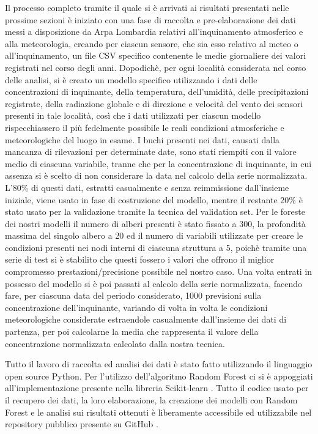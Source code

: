 \documentclass[a4paper]{report}
\begin{document}
Il processo completo tramite il quale si è arrivati ai risultati presentati nelle prossime sezioni è iniziato con una fase di raccolta e pre-elaborazione dei dati messi a disposizione da Arpa Lombardia relativi all'inquinamento atmosferico e alla meteorologia, creando per ciascun sensore, che sia esso relativo al meteo o all'inquinamento, un file CSV specifico contenente le medie giornaliere dei valori registrati nel corso degli anni. Dopodichè, per ogni località considerata nel corso delle analisi, si è creato un modello specifico utilizzando i dati delle concentrazioni di inquinante, della temperatura, dell'umidità, delle precipitazioni registrate, della radiazione globale e di direzione e velocità del vento dei sensori presenti in tale località, così che i dati utilizzati per ciascun modello rispecchiassero il più fedelmente possibile le reali condizioni atmosferiche e meteorologiche del luogo in esame. I buchi presenti nei dati, causati dalla mancanza di rilevazioni per determinate date, sono stati riempiti con il valore medio di ciascuna variabile, tranne che per la concentrazione di inquinante, in cui assenza si è scelto di non considerare la data nel calcolo della serie normalizzata. L'80\% di questi dati, estratti casualmente e senza reimmissione dall'insieme iniziale, viene usato in fase di costruzione del modello, mentre il restante 20\% è stato usato per la validazione tramite la tecnica del validation set. Per le foreste dei nostri modelli il numero di alberi presenti è stato fissato a 300, la profondità massima del singolo albero a 20 ed il numero di variabili utilizzate per creare le condizioni presenti nei nodi interni di ciascuna struttura a 5, poichè tramite una serie di test si è stabilito che questi fossero i valori che offrono il miglior compromesso prestazioni/precisione possibile nel nostro caso. Una volta entrati in possesso del modello si è poi passati al calcolo della serie normalizzata, facendo fare, per ciascuna data del periodo considerato, 1000 previsioni sulla concentrazione dell'inquinante, variando di volta in volta le condizioni meteorologiche considerate estraendole casualmente dall'insieme dei dati di partenza, per poi calcolarne la media che rappresenta il valore della concentrazione normalizzata calcolato dalla nostra tecnica. 

Tutto il lavoro di raccolta ed analisi dei dati è stato fatto utilizzando il linguaggio open source Python. Per l'utilizzo dell'algoritmo Random Forest ci si è appoggiati all'implementazione presente nella libreria Scikit-learn \cite{scikit-learn}. Tutto il codice usato per il recupero dei dati, la loro elaborazione, la creazione dei modelli con Random Forest e le analisi sui risultati ottenuti è liberamente accessibile ed utilizzabile nel repository pubblico presente su GitHub \cite{belotti2020}.
\end{document}
